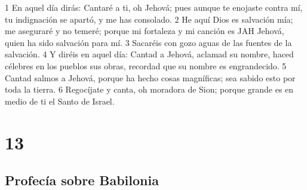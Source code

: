 1 En aquel día dirás: Cantaré a ti, oh Jehová; pues aunque te enojaste contra mí, tu indignación se apartó, y me has consolado.
2 He aquí Dios es salvación mía; me aseguraré y no temeré; porque mi fortaleza y mi canción es JAH Jehová, quien ha sido salvación para mí.
3 Sacaréis con gozo aguas de las fuentes de la salvación.
4 Y diréis en aquel día: Cantad a Jehová, aclamad su nombre, haced célebres en los pueblos sus obras, recordad que su nombre es engrandecido.
5 Cantad salmos a Jehová, porque ha hecho cosas magníficas; sea sabido esto por toda la tierra.
6 Regocíjate y canta, oh moradora de Sion; porque grande es en medio de ti el Santo de Israel.

\chapter{13}

\section*{Profecía sobre Babilonia}

